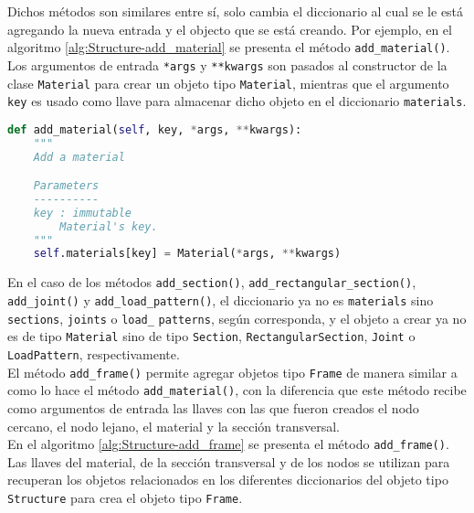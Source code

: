 Dichos métodos son similares entre sí, solo cambia el diccionario al cual se le está agregando la nueva entrada y el objecto que se está creando. Por ejemplo, en el algoritmo \ref{alg:Structure-add_material} se presenta el método \verb|add_material()|. Los argumentos de entrada 
\verb|*args| y \verb|**kwargs| son pasados al constructor de la clase \verb|Material| para crear un objeto tipo \verb|Material|, mientras que el argumento \verb|key| es usado como llave para almacenar dicho objeto en el diccionario \verb|materials|.\\

\begin{lstlisting}[language=Python,caption=Método \texttt{add\_material()} de la clase \texttt{Structure}.,label=alg:Structure-add_material, frame=single]
def add_material(self, key, *args, **kwargs):
    """
    Add a material

    Parameters
    ----------
    key : immutable
        Material's key.
    """
    self.materials[key] = Material(*args, **kwargs)
\end{lstlisting}
\bigskip
En el caso de los métodos \verb|add_section()|, \verb|add_rectangular_section()|, \verb|add_joint()| y \verb|add_load_pattern()|, el diccionario ya no es \verb|materials| sino \verb|sections|, \verb|joints| o \verb|load_| \verb|patterns|, según corresponda, y el objeto a crear ya no es de tipo \verb|Material| sino de tipo \verb|Section|, \verb|RectangularSection|, \verb|Joint| o \verb|LoadPattern|, respectivamente.\\

El método \verb|add_frame()| permite agregar objetos tipo \verb|Frame| de manera similar a como lo hace el método \verb|add_material()|, con la diferencia que este método recibe como argumentos de entrada las llaves con las que fueron creados el nodo cercano, el nodo lejano, el material y la sección transversal.\\

En el algoritmo \ref{alg:Structure-add_frame} se presenta el método \verb|add_frame()|. Las llaves del material, de la sección transversal y de los nodos se utilizan para recuperan los objetos relacionados en los diferentes diccionarios del objeto tipo \verb|Structure| para crea el objeto tipo \verb|Frame|.\\


